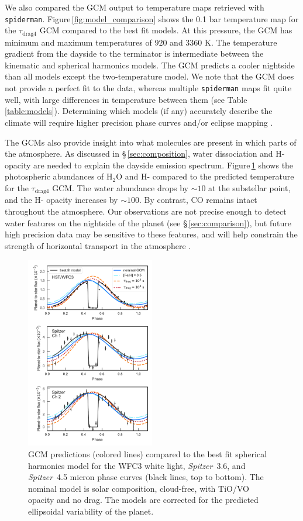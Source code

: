 \documentclass[twocolumn, trackchanges]{aastex61}
\newcommand{\project}[1]{\textsl{#1}}
\newcommand{\Spitzer}{\project{Spitzer}}
\begin{document}
We also compared the GCM output to temperature maps retrieved with \texttt{spiderman}. Figure\,\ref{fig:model_comparison} shows the 0.1 bar temperature map for the $\tau_\mathrm{drag4}$ GCM compared to the best fit models. At this pressure, the GCM has minimum and maximum temperatures of $920$ and $3360$ K. The temperature gradient from the dayside to the terminator is intermediate between the kinematic and spherical harmonics models. The GCM predicts a cooler nightside than all models except the two-temperature model. We note that the GCM does not provide a perfect fit to the data, whereas multiple \texttt{spiderman} maps fit quite well, with large differences in temperature between them (see Table \,\ref{table:models}). Determining which models (if any) accurately describe the climate will require higher precision phase curves and/or eclipse mapping \citep[e.g.][]{dewit12}. 

The GCMs also provide insight into what molecules are present in which parts of the atmosphere. As discussed in \S\,\ref{sec:composition}, water dissociation and H- opacity are needed to explain the dayside emission spectrum. Figure\,\ref{fig:gcmcomparison} shows the photospheric abundances of H$_2$O and H- compared to the predicted temperature for the $\tau_\mathrm{drag4}$ GCM. The water abundance drops by $\sim10$ at the substellar point, and the H- opacity increases by $\sim100$.  By contrast, CO remains intact throughout the atmosphere.  Our observations are not precise enough to detect water features on the nightside of the planet (see \S\,\ref{sec:comparison}), but future high precision data may be sensitive to these features, and will help constrain the strength of horizontal transport in the atmosphere \citep{agundez14}.

\begin{figure}
\includegraphics[width = 0.5\textwidth]{fig15.pdf}
\caption{GCM predictions (colored lines) compared to the best fit spherical harmonics model for the WFC3 white light, \Spitzer\ 3.6, and \Spitzer\ 4.5 micron phase curves (black lines, top to bottom). The nominal model is solar composition, cloud-free, with TiO/VO opacity and no drag. The models are corrected for the predicted ellipsoidal variability of the planet.}
\label{fig:gcmcomparison}
\end{figure}
\end{document}

